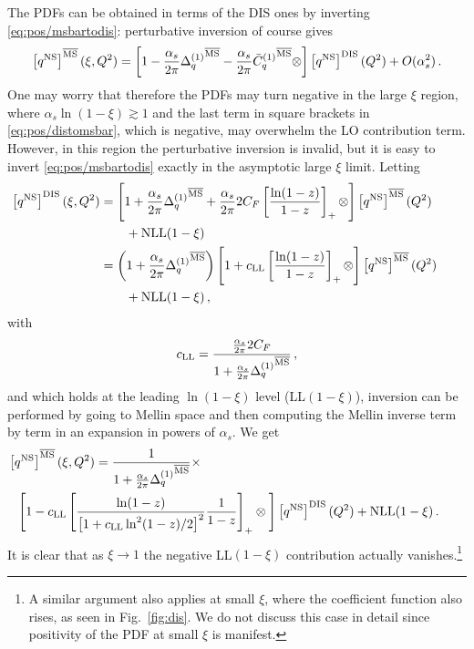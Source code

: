 The \msbar{} PDFs can be obtained in terms of the DIS ones by inverting
\cref{eq:pos/msbartodis}: perturbative inversion of course gives
\begin{equation}\label{eq:pos/distomsbar}
\left[{q^{{\textrm{NS}}}}\right]^{{\overline{\textrm{MS}}}}(\xi,Q^2)=
\left[1-\frac{\alpha_s}{2\pi} {\Delta^{(1)}_q}^{{\overline{\textrm{MS}}}}
  -\frac{\alpha_s}{2\pi}  {\bar
    C^{(1)}_q{}}^{{\overline{\textrm{MS}}}}\otimes\right]\left[{q^{{\textrm{NS}}}}\right]^{\textrm{DIS}}(Q^2)
+O(\alpha_s^2) \,.
\end{equation}
One may worry that therefore the \msbar{} PDFs may turn negative in the
large $\xi$ region, where $\alpha_s\ln(1-\xi)\gtrsim 1$ and the last term
in square brackets in \cref{eq:pos/distomsbar}, which is negative, may overwhelm the LO
contribution 
term. However, in this region the perturbative
inversion is invalid, but it is easy to invert
\cref{eq:pos/msbartodis} exactly in the asymptotic large $\xi$ limit.
Letting
\begin{align}\label{eq:pos/msbartodisp}
    \hspace{-20pt}\left[{q^{\NS}}\right]^{\textrm{DIS}}(\xi,Q^2)&=
\left[1+\frac{\alpha_s}{2\pi} {\Delta^{(1)}_q}^{\mmsbar}
  +\frac{\alpha_s}{2\pi} 2C_F\left[\frac{\ln(1-z)}{1-z}\right]_+
  \otimes\right]\left[{q^{\NS}}\right]^{\mmsbar}(Q^2)\nonumber\\
    &\qquad+ \hbox{NLL}(1-\xi)\\
\label{eq:pos/msbartodisp1}
    &= \left(1+\frac{\alpha_s}{2\pi} {\Delta^{(1)}_q}^{\mmsbar}\right) 
\left[1+c_{\textrm{LL}}\left[\frac{\ln(1-z)}{1-z}\right]_+
\otimes\right]\left[{q^{\NS}}\right]^{\mmsbar}(Q^2)\nonumber\\
    &\qquad+ \hbox{NLL}(1-\xi) \,,
\end{align}
with
\begin{equation}
    \label{eq:pos/msbartodiscoeff}
    c_{\textrm{LL}} = \frac{\frac{\alpha_s}{2\pi} 2C_F}{1+\frac{\alpha_s}{2\pi} {\Delta^{(1)}_q}^{{\overline{\textrm{MS}}}}} \,, 
\end{equation}
and which holds at the leading $\ln(1-\xi)$ level (LL$(1-\xi)$),
inversion can be performed by going to Mellin space and then computing
the Mellin inverse term by term in an expansion in powers of $\alpha_s$.
We get
\begin{align}\label{eq:pos/distomsbarllx}
    \hspace*{-20pt} \left[{q^{\NS}}\right]^{\mmsbar}(\xi,Q^2) &= \frac{1}{1+\frac{\alpha_s}{2\pi} {\Delta^{(1)}_q}^{\mmsbar}} \times \nonumber\\
    &\hspace*{-60pt}\Bigg[1 -c_{\textrm{LL}} \left[ \frac{\ln(1-z)}{\left[1+c_{\textrm{LL}}\ln^2(1-z)/2\right]^2}  \frac{1}{1-z}\right]_+
\otimes\Bigg]\left[{q^{\NS}}\right]^{\textrm{DIS}}(Q^2) + \hbox{NLL}(1-\xi) \,.
\end{align}
It is clear that as $\xi\to 1$ the negative LL$(1-\xi)$ contribution
actually vanishes.\footnote{A similar argument also applies at small
  $\xi$, where the coefficient function also rises, as seen in
  Fig.~\ref{fig:dis}. We do not discuss this case in detail since
  positivity of the \msbar{} PDF at small $\xi$ is manifest.}




